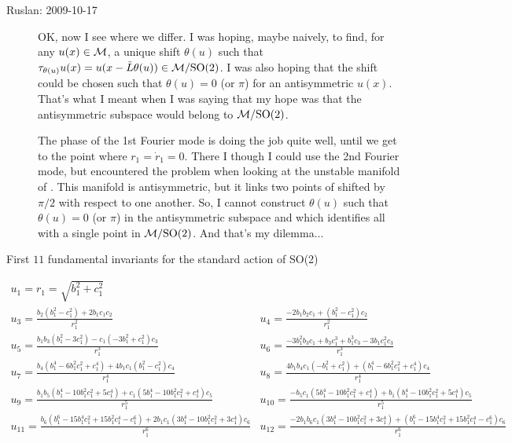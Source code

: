 \begin{description}
\item[Ruslan: 2009-10-17]
OK, now I see where we differ.  I was hoping, maybe naively,
to find, for any $u(x) \in {\cal M}$, a unique shift $\theta(u)$
such that $\tau_{\theta(u)} u(x) = u(x - \tilde{L}\theta(u))
\in {\cal M}/\textrm{SO}(2)$.  I was also hoping that the shift could be
chosen such that $\theta(u) = 0$ (or $\pi$) for an
antisymmetric $u(x)$.  That's what I meant when I was saying
that my hope was that the antisymmetric subspace would belong
to ${\cal M}/\textrm{SO}(2)$.

The phase of the 1st Fourier mode is doing the job quite
well, until we get to the point where $r_1 = \dot{r}_1 = 0$.
There I though I could use the 2nd Fourier mode, but
encountered the problem when looking at the unstable manifold
of .  This manifold is antisymmetric, but it links two
points of  shifted by $\pi/2$ with respect to one
another.  So, I cannot construct $\theta(u)$ such that
$\theta(u) = 0$ (or $\pi$) in the antisymmetric subspace and
which identifies all  with a single point in
${\cal M}/\textrm{SO}(2)$.  And that's my dilemma...


\end{description}


\begin{table}[t]
\caption
{First $11$ fundamental invariants for the standard action
  of SO(2)}
\scriptsize
\[
\begin{array}{ll}
  u_1=r_1=\sqrt{b_1^2+c_1^2}&  \\ u_3=\frac{b_2 \left(b_1^2-c_1^2\right)+2 b_1 c_1 c_2}{r_1^2}&u_4=\frac{-2
b_1 b_2 c_1+\left(b_1^2-c_1^2\right) c_2}{r_1^2}\\ u_5=\frac{b_1 b_3 \left(b_1^2-3 c_1^2\right)-c_1 \left(-3
b_1^2+c_1^2\right) c_3}{r_1^3}&u_6=\frac{-3 b_1^2 b_3 c_1+b_3 c_1^3+b_1^3 c_3-3 b_1 c_1^2 c_3}{r_1^3}\\ u_7=\frac{b_4
\left(b_1^4-6 b_1^2 c_1^2+c_1^4\right)+4 b_1 c_1 \left(b_1^2-c_1^2\right) c_4}{r_1^4}&u_8=\frac{4 b_1
b_4 c_1 \left(-b_1^2+c_1^2\right)+\left(b_1^4-6 b_1^2 c_1^2+c_1^4\right) c_4}{r_1^4}\\ u_9=\frac{b_1
b_5 \left(b_1^4-10 b_1^2 c_1^2+5 c_1^4\right)+c_1 \left(5 b_1^4-10 b_1^2 c_1^2+c_1^4\right) c_5}{r_1^5}&u_{10}=\frac{-b_5
c_1 \left(5 b_1^4-10 b_1^2 c_1^2+c_1^4\right)+b_1 \left(b_1^4-10 b_1^2 c_1^2+5 c_1^4\right) c_5}{r_1^5}\\ u_{11}=\frac{b_6
\left(b_1^6-15 b_1^4 c_1^2+15 b_1^2 c_1^4-c_1^6\right)+2 b_1 c_1 \left(3 b_1^4-10 b_1^2 c_1^2+3 c_1^4\right) c_6}{r_1^6}&u_{12}=\frac{-2
b_1 b_6 c_1 \left(3 b_1^4-10 b_1^2 c_1^2+3 c_1^4\right)+\left(b_1^6-15 b_1^4 c_1^2+15 b_1^2 c_1^4-c_1^6\right) c_6}{r_1^6}\\
\end{array}
\]
\label{tab:SO2n6}
\end{table}

